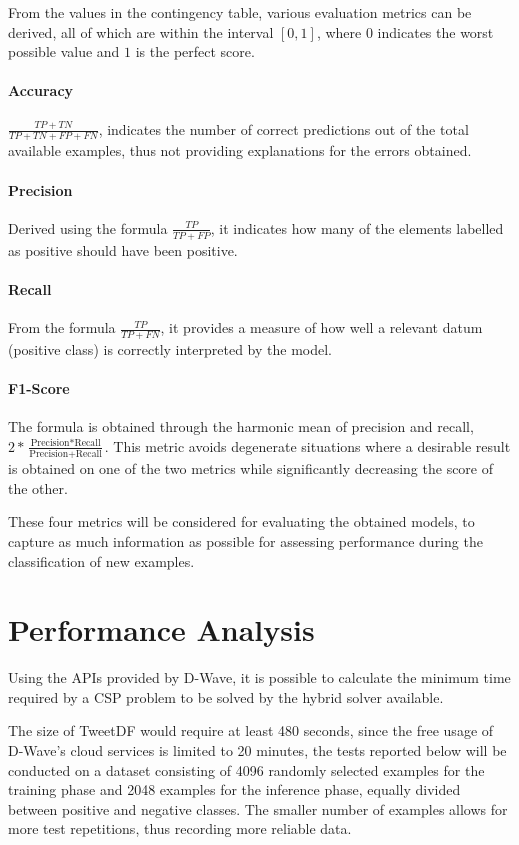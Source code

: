 From the values in the contingency table, various evaluation metrics can be derived, all of which are within the interval $[0, 1]$, where $0$ indicates the worst possible value and $1$ is the perfect score.

\paragraph{Accuracy} $\frac{TP + TN}{TP + TN + FP + FN}$, indicates the number of correct predictions out of the total available examples, thus not providing explanations for the errors obtained.

\paragraph{Precision} Derived using the formula $\frac{TP}{TP + FP}$, it indicates how many of the elements labelled as positive should have been positive.

\paragraph{Recall} From the formula $\frac{TP}{TP + FN}$, it provides a measure of how well a relevant datum (positive class) is correctly interpreted by the model.

\paragraph{F1-Score} The formula is obtained through the harmonic mean of precision and recall, $2*\frac{\text{Precision}*\text{Recall}}{\text{Precision}+\text{Recall}}$. This metric avoids degenerate situations where a desirable result is obtained on one of the two metrics while significantly decreasing the score of the other.

These four metrics will be considered for evaluating the obtained models, to capture as much information as possible for assessing performance during the classification of new examples.

\section{Performance Analysis}

Using the APIs provided by D-Wave, it is possible to calculate the minimum time required by a CSP problem to be solved by the hybrid solver available.

The size of TweetDF would require at least 480 seconds, since the free usage of D-Wave's cloud services is limited to 20 minutes, the tests reported below will be conducted on a dataset consisting of 4096 randomly selected examples for the training phase and 2048 examples for the inference phase, equally divided between positive and negative classes. The smaller number of examples allows for more test repetitions, thus recording more reliable data.

